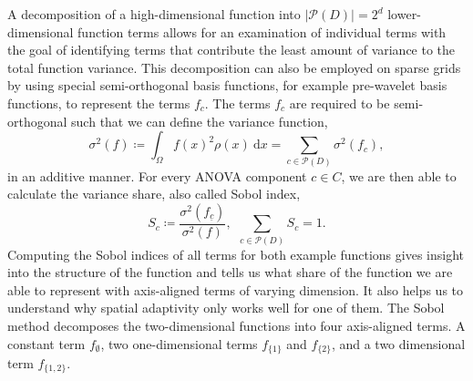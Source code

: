 \documentclass[
  a4paper,  %
  twoside,  %
  bibliography=totoc,
  headsepline,
  cleardoublepage=empty,
  parskip=half,
  draft=false
]{scrbook}
\begin{document}
A decomposition of a high-dimensional function into $|\mathcal{P}(D)|=2^d$ lower-dimensional function terms allows for an examination of individual terms with the goal of identifying terms that contribute the least amount of variance to the total function variance.
This decomposition can also be employed on sparse grids \cite{Feuersaenger2010} by using special semi-orthogonal basis functions, for example pre-wavelet basis functions, to represent the terms $f_c$.
The terms $f_c$ are required to be semi-orthogonal such that we can define the variance function,
\begin{equation}
\sigma^2(f) \coloneqq \int_{\Omega} f(x)^2 \rho(x) ~ \text{d} x=\sum_{c \in \mathcal{P}(D)} \sigma^2(f_c),
\end{equation}
in an additive manner.
For every ANOVA component $c \in C$, we are then able to calculate the variance share, also called Sobol index,
\begin{equation}
S_{c} \coloneqq \frac{\sigma^2(f_{\underline{c}} )}{\sigma^2(f)}, ~~ \sum_{c \in \mathcal{P}(D)} S_{c} = 1.
\end{equation}
Computing the Sobol indices of all terms for both example functions gives insight into the structure of the function and tells us what share of the function we are able to represent with axis-aligned terms of varying dimension.
It also helps us to understand why spatial adaptivity only works well for one of them.
The Sobol method decomposes the two-dimensional functions into four axis-aligned terms.
A constant term $f_\emptyset$, two one-dimensional terms $f_{\{1\}}$ and $f_{\{2\}}$, and a two dimensional term $f_{\{1,2\}}$.
\end{document}
